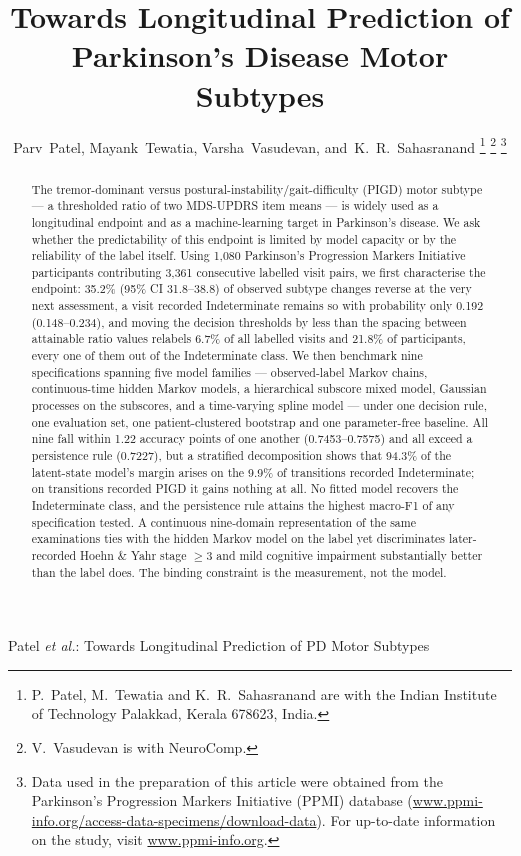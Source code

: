 \documentclass[journal]{IEEEtran}
\begin{document}
\title{Towards Longitudinal Prediction of\\
Parkinson's Disease Motor Subtypes}

\author{Parv~Patel,
        Mayank~Tewatia,
        Varsha~Vasudevan,
        and~K.~R.~Sahasranand%
\thanks{P.~Patel, M.~Tewatia and K.~R.~Sahasranand are with the Indian
Institute of Technology Palakkad, Kerala 678623, India.}%
\thanks{V.~Vasudevan is with NeuroComp.}%
\thanks{Data used in the preparation of this article were obtained from the
Parkinson's Progression Markers Initiative (PPMI) database
(\protect\url{www.ppmi-info.org/access-data-specimens/download-data}). For up-to-date
information on the study, visit \protect\url{www.ppmi-info.org}.}}

%
{Patel \MakeLowercase{\textit{et al.}}: Towards Longitudinal Prediction of PD Motor Subtypes}

\maketitle

\begin{abstract}
The tremor-dominant versus postural-instability/gait-difficulty (PIGD) motor
subtype --- a thresholded ratio of two MDS-UPDRS item means --- is widely used
as a longitudinal endpoint and as a machine-learning target in Parkinson's
disease. We ask whether the predictability of this endpoint is limited by model
capacity or by the reliability of the label itself. Using 1,080 Parkinson's
Progression Markers Initiative participants contributing 3,361 consecutive
labelled visit pairs, we first characterise the endpoint: 35.2\% (95\% CI
31.8--38.8) of observed subtype changes reverse at the very next assessment, a
visit recorded Indeterminate remains so with probability only 0.192
(0.148--0.234), and moving the decision thresholds by less than the spacing
between attainable ratio values relabels 6.7\% of all labelled visits and
21.8\% of participants, every one of them out of the Indeterminate class. We
then benchmark nine specifications spanning five model families --- observed-label
Markov chains, continuous-time hidden Markov models, a hierarchical subscore
mixed model, Gaussian processes on the subscores, and a time-varying spline
model --- under one decision rule, one evaluation set, one patient-clustered
bootstrap and one parameter-free baseline. All nine fall within 1.22 accuracy
points of one another (0.7453--0.7575) and all exceed a persistence rule
(0.7227), but a stratified decomposition shows that 94.3\% of the latent-state
model's margin arises on the 9.9\% of transitions recorded Indeterminate; on
transitions recorded PIGD it gains nothing at all. No fitted model recovers the
Indeterminate class, and the persistence rule attains the highest macro-F1 of
any specification tested. A continuous nine-domain representation of the same
examinations ties with the hidden Markov model on the label yet discriminates
later-recorded Hoehn \& Yahr stage $\geq 3$ and mild cognitive impairment
substantially better than the label does. The binding constraint is the
measurement, not the model.
\end{abstract}
\end{document}
